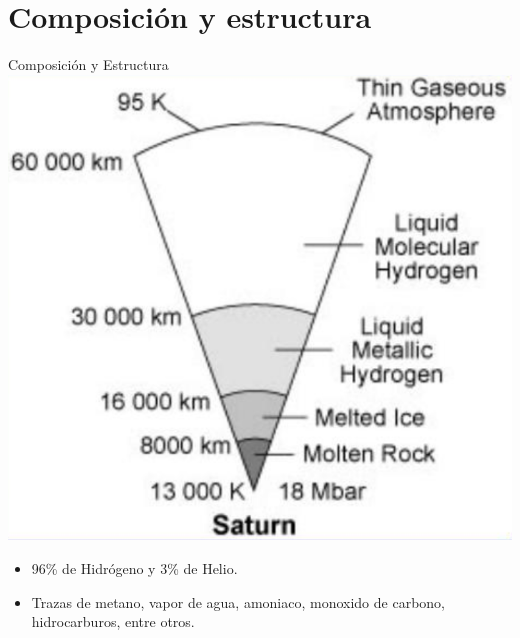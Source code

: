 \documentclass{beamer}
\begin{document}
\section{Composición y estructura}
\begin{frame}{Composición y Estructura}
    \centering
    \includegraphics[width=0.4\paperwidth]{saturn_is}
    \begin{itemize}
        \item 96\% de Hidrógeno y 3\% de Helio.
        \item Trazas de	metano, vapor de agua, amoniaco, monoxido de carbono, hidrocarburos, entre otros.	
    \end{itemize}

    \vspace{5mm}

\end{frame}
\end{document}
